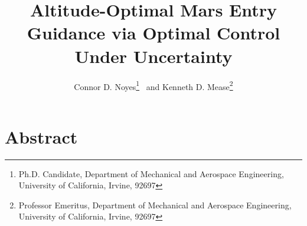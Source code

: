 \documentclass[journal ]{new-aiaa}
\title{Altitude-Optimal Mars Entry Guidance via Optimal Control Under Uncertainty}
\begin{document}
\author{Connor D. Noyes\thanks{Ph.D. Candidate, Department of Mechanical and Aerospace Engineering, University of California, Irvine, 92697} \ and Kenneth D. Mease\thanks{Professor Emeritus, Department of Mechanical and Aerospace Engineering, University of California, Irvine, 92697}}
\maketitle





\section*{Abstract}
\end{document}
